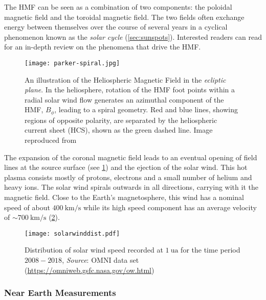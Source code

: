 The HMF can be seen as a combination of two components: the poloidal magnetic field and the 
toroidal magnetic field. The two fields often exchange energy between themselves over the course of 
several years in a cyclical phenomenon known as the \emph{solar cycle} 
(\cref{sec:sunspots}). Interested readers can read \citet{Owens2013} for an in-depth review on the 
phenomena that drive the HMF.

\begin{figure}
    \noindent\texttt{[image: parker-spiral.jpg]}
    \caption{
        {\small 
            An illustration of the Heliospheric Magnetic Field in the \emph{ecliptic plane}. In the 
            heliosphere, rotation of the HMF foot points within a radial solar wind flow generates 
            an azimuthal component of the HMF, $B_{\phi}$, leading to a spiral geometry. Red and 
            blue lines, showing regions of opposite polarity, are separated by the heliospheric 
            current sheet (HCS), shown as the green dashed line. Image reproduced from 
            \citet{Owens2013}
        }
    }\label{fig:parkerspiral}
\end{figure}


The expansion of the coronal magnetic field leads to an eventual opening of field lines at the 
source surface (see \cref{fig:parkerspiral}) and the ejection of the solar wind. This hot plasma 
consists mostly of protons, electrons and a small number of helium and heavy ions. The solar wind 
spirals outwards in all directions, carrying with it the magnetic field. Close to the Earth's 
magnetosphere, this wind has a nominal speed of about $\SI{400}{\kilo\metre\per\second}$ while its 
high speed component has an average velocity of $\sim \SI{700}{\kilo\metre\per\second}$ 
(\cref{fig:solarwinddist}).

\begin{figure}
    \noindent\centering\texttt{[image: solarwinddist.pdf]}
    \caption{
        {\small 
            Distribution of solar wind speed recorded at $\SI{1}{\astronomicalunit}$ for the time 
            period $2008 - 2018$, \textit{Source}: OMNI data set 
            (\url{https://omniweb.gsfc.nasa.gov/ow.html})
        }
    }\label{fig:solarwinddist}
\end{figure}

\subsubsection*{Near Earth Measurements}\label{sec:l1point}

